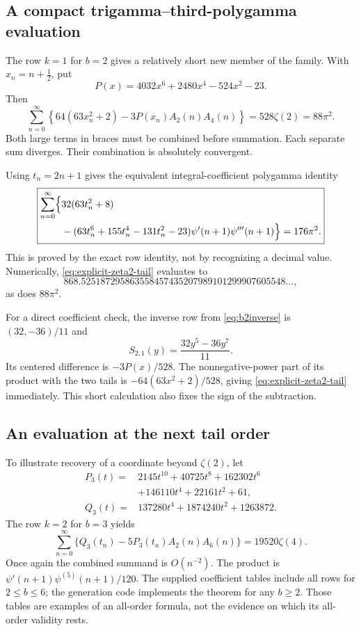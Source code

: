 \documentclass[11pt,letterpaper]{article}
\theoremstyle{definition}
\theoremstyle{remark}
\numberwithin{equation}{section}
\begin{document}
\subsection{A compact trigamma--third-polygamma evaluation}

The row $k=1$ for $b=2$ gives a relatively short new member of the
family. With $x_n=n+\tfrac12$, put
\[
 P(x)=4032x^6+2480x^4-524x^2-23.
\]
Then
\begin{equation}\label{eq:explicit-zeta2-tail}
 \boxed{\displaystyle
 \sum_{n=0}^{\infty}
 \left\{64(63x_n^2+2)-3P(x_n)A_2(n)A_4(n)\right\}
 =528\zeta(2)=88\pi^2.}
\end{equation}
Both large terms in braces must be combined before summation. Each
separate sum diverges. Their combination is absolutely convergent.

Using $t_n=2n+1$ gives the equivalent integral-coefficient
polygamma identity
\begin{equation}\label{eq:explicit-zeta2-polygamma}
 \boxed{\begin{aligned}
 \sum_{n=0}^{\infty}\Bigl\{
 &32(63t_n^2+8)\\
 &-(63t_n^6+155t_n^4-131t_n^2-23)
          \psi'(n+1)\psi'''(n+1)\Bigr\}=176\pi^2.
 \end{aligned}}
\end{equation}
This is proved by the exact row identity, not by recognizing a decimal
value. Numerically, \eqref{eq:explicit-zeta2-tail} evaluates to
\[
 868.525187295863558457435207989101299907605548\ldots,
\]
as does $88\pi^2$.

For a direct coefficient check, the inverse row from
\eqref{eq:b2inverse} is $(32,-36)/11$ and
\[
 S_{2,1}(y)=\frac{32y^5-36y^7}{11}.
\]
Its centered difference is $-3P(x)/528$. The nonnegative-power
part of its product with the two tails is
$-64(63x^2+2)/528$, giving
\eqref{eq:explicit-zeta2-tail} immediately. This short calculation
also fixes the sign of the subtraction.

\subsection{An evaluation at the next tail order}

To illustrate recovery of a coordinate beyond $\zeta(2)$, let
\begin{align*}
 P_3(t)={}&2145t^{10}+40725t^8+162302t^6\\
          &+146110t^4+22161t^2+61,\\
 Q_3(t)={}&137280t^4+1874240t^2+1263872.
\end{align*}
The row $k=2$ for $b=3$ yields
\begin{equation}\label{eq:explicit-zeta4}
 \boxed{\displaystyle
 \sum_{n=0}^{\infty}
  \{Q_3(t_n)-5P_3(t_n)A_2(n)A_6(n)\}
 =19520\zeta(4).}
\end{equation}
Once again the combined summand is $O(n^{-2})$. The product is
$\psi'(n+1)\psi^{(5)}(n+1)/120$.
The supplied coefficient tables include all rows for $2\leq b\leq6$;
the generation code implements the theorem for any $b\geq2$.
Those tables are examples of an all-order formula, not the evidence
on which its all-order validity rests.
\end{document}
